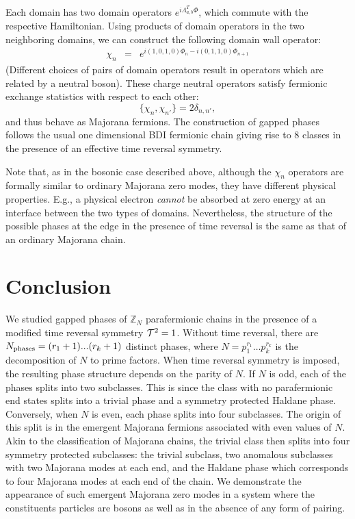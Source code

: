 \documentclass[twocolumn,aps,prb,showpacs]{revtex4-1}
\begin{document}
Each domain has two  domain operators $ e^{i\Lambda_{a,b}^T\Phi} $, which  commute with the respective Hamiltonian.
Using products of domain operators in the two neighboring domains, we can construct  the following domain wall operator:
\begin{eqnarray}
\chi_n&=&e^{i(1,0,1,0)\Phi_n-i(0,1,1,0)\Phi_{n+1}}
\end{eqnarray}
(Different  choices  of pairs of domain operators  result in operators which are  related by a neutral boson).
These charge neutral operators satisfy fermionic exchange statistics with respect to each other:
\begin{equation}
\{\chi_{n},\chi_{n'}\}=2\delta_{n,n'},
\end{equation}
and thus behave as Majorana fermions.
The construction of gapped phases follows the usual one dimensional BDI fermionic chain giving rise to $8 $ classes in the presence of  an effective time reversal symmetry.

Note that, as in the bosonic case described above, although the $\chi_n$ operators are formally similar to ordinary Majorana zero modes, they have different physical properties. E.g., a physical electron \emph{cannot} be absorbed at zero energy at an interface between the two types of domains. Nevertheless, the structure of the possible phases at the edge in the presence of time reversal is the same as that of an ordinary Majorana chain.

\section{Conclusion}\label{conclusion}
We studied gapped phases of $\mathbb{Z}_N$  parafermionic chains in the presence of a modified time reversal symmetry ${\cal T}^2 =1 $.
Without time reversal, there are $N_{\rm phases} = (r_1+1)...(r_k+1)$ distinct phases, where $N=p_1^{r_1}\dots p_k^{r_k}$ is the decomposition of $N$ to prime factors. When time reversal symmetry is imposed, the resulting phase structure depends on the parity of $N$. 
If $N $ is odd, each of the  phases  splits into two  subclasses. This is since the class with no parafermionic end states  splits into a trivial phase and a symmetry protected Haldane phase. Conversely, when $N $ is even, each phase splits into four subclasses. The origin of this split is in the emergent Majorana fermions associated with even values of $N$. Akin to the classification of Majorana chains,  the trivial class then splits into four symmetry protected subclasses: the  trivial subclass, two anomalous subclasses with two Majorana modes at each end, and the Haldane phase which corresponds to  four Majorana modes at each end of the chain. We demonstrate the appearance of such emergent Majorana zero modes in a system where the constituents particles are  bosons as well as in the absence of any form of pairing.
\end{document}
